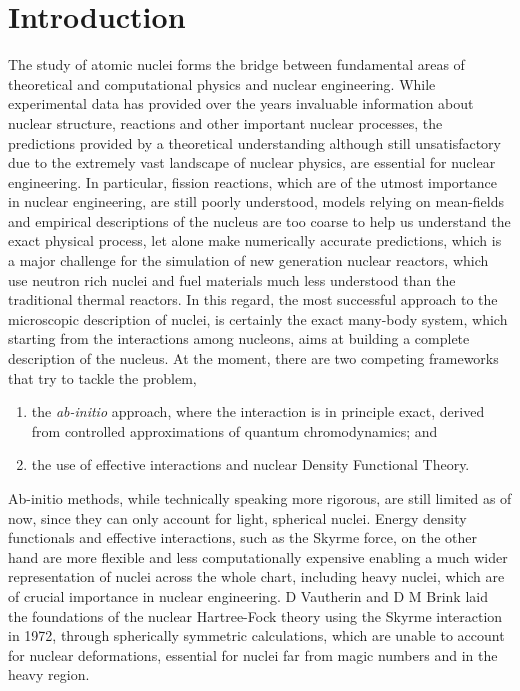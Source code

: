 \chapter*{Introduction}
The study of atomic nuclei forms the bridge between fundamental areas of theoretical and computational physics and nuclear engineering. While experimental data has provided over the years invaluable information about nuclear structure, reactions and other important nuclear processes, the predictions provided by a theoretical understanding although still unsatisfactory due to the extremely vast landscape of nuclear physics, are essential for nuclear engineering.
In particular, fission reactions, which are of the utmost importance in nuclear engineering, are still poorly understood, models relying on mean-fields and empirical descriptions of the nucleus are too coarse to help us understand the exact physical process, let alone make numerically accurate predictions, which is a major challenge for the simulation of new generation nuclear reactors, which use neutron rich nuclei and fuel materials much less understood than the traditional thermal reactors.
In this regard, the most successful approach to the microscopic description of nuclei, is certainly the exact many-body system, which starting from the interactions among nucleons, aims at building a complete description of the nucleus.
At the moment, there are two competing frameworks that try to tackle the problem, 
\begin{enumerate}[i]
\item the \textit{ab-initio} approach, where the interaction is in principle exact, derived from controlled approximations of quantum chromodynamics; and
\item  the use of effective interactions and nuclear Density Functional Theory.
\end{enumerate}
Ab-initio methods, while technically speaking more rigorous, are still limited as of now, since they can only account for light, spherical nuclei.
Energy density functionals and effective interactions, such as the Skyrme force, on the other hand are more flexible and less computationally expensive enabling a much wider representation of nuclei across the whole chart, including heavy nuclei, which are of crucial importance in nuclear engineering.
D Vautherin and D M Brink laid the foundations of the nuclear Hartree-Fock theory using the Skyrme interaction in 1972, through spherically symmetric calculations, which are unable to account for nuclear deformations, essential for nuclei far from magic numbers and in the heavy region.
